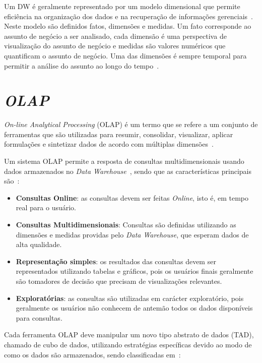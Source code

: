 Um DW é geralmente representado por um modelo dimensional que permite eficiência na organização dos dados e na recuperação de informações gerenciais~\cite{kimballDataWarehouseToolkit2013}.
Neste modelo são definidos fatos, dimensões e medidas.
Um fato corresponde ao assunto de negócio a ser analisado, cada dimensão é uma perspectiva de visualização do assunto de negócio e medidas são valores numéricos que quantificam o assunto de negócio.
Uma das dimensões é sempre temporal para permitir a análise do assunto ao longo do tempo~\cite{silva:2015:abordagensParaCubo}.

\section{\textit{OLAP}}\label{ch:fun:olap}

\textit{On-line Analytical Processing} (OLAP) é um termo que se refere a um conjunto de ferramentas que são utilizadas para resumir, consolidar, visualizar, aplicar formulações e sintetizar dados de acordo com múltiplas dimensões~\cite{coddProvidingOlapUseranalysts1998}.

Um sistema OLAP permite a resposta de consultas multidimensionais usando dados armazenados no \textit{Data Warehouse}~\cite{kimballDataWarehouseToolkit2013}, sendo que as características principais são~\cite{bimonteOpenIssuesBig2016}:

\begin{itemize}
	\item \textbf{Consultas Online}: as consultas devem ser feitas \textit{Online}, isto é, em tempo real para o usuário.
	\item \textbf{Consultas Multidimensionais}: Consultas são definidas utilizando as dimensões e medidas providas pelo \textit{Data Warehouse}, que esperam dados de alta qualidade.
	\item \textbf{Representação simples}: os resultados das consultas devem ser representados utilizando tabelas e gráficos, pois os usuários finais geralmente são tomadores de decisão que precisam de visualizações relevantes.
	\item \textbf{Exploratórias}: as consultas são utilizadas em carácter exploratório, pois geralmente os usuários não conhecem de antemão todos os dados disponíveis para consultas.
\end{itemize}

Cada ferramenta OLAP deve manipular um novo tipo abstrato de dados (TAD), chamado de cubo de dados, utilizando estratégias específicas devido ao modo de como os dados são armazenados, sendo classificadas em~\cite{moreiraFullPartialData2012}:

